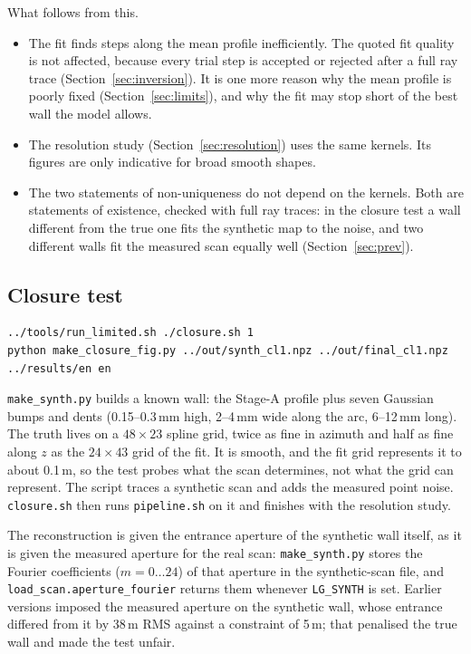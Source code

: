 \documentclass[11pt,a4paper]{article}
\newcommand{\um}{\,\textmu m}
\newcommand{\code}[1]{\texttt{#1}}
\begin{document}
What follows from this.
\begin{itemize}
\item The fit finds steps along the mean profile inefficiently. The quoted fit quality is not
affected, because every trial step is accepted or rejected after a full ray trace
(Section~\ref{sec:inversion}). It is one more reason why the mean profile is poorly fixed
(Section~\ref{sec:limits}), and why the fit may stop short of the best wall the model allows.
\item The resolution study (Section~\ref{sec:resolution}) uses the same kernels. Its figures are
only indicative for broad smooth shapes.
\item The two statements of non-uniqueness do not depend on the kernels. Both are statements of
existence, checked with full ray traces: in the closure test a wall different from the true one fits
the synthetic map to the noise, and two different walls fit the measured scan equally well
(Section~\ref{sec:prev}).
\end{itemize}

\subsection{Closure test}

\begin{lstlisting}
../tools/run_limited.sh ./closure.sh 1
python make_closure_fig.py ../out/synth_cl1.npz ../out/final_cl1.npz ../results/en en
\end{lstlisting}
\code{make\_synth.py} builds a known wall: the Stage-A profile plus seven Gaussian bumps and dents
(0.15--0.3\,mm high, 2--4\,mm wide along the arc, 6--12\,mm long). The truth lives on a
$48\times23$ spline grid, twice as fine in azimuth and half as fine along $z$ as the $24\times43$
grid of the fit. It is smooth, and the fit grid represents it to about 0.1\um, so the test probes
what the scan determines, not what the grid can represent. The script traces a synthetic scan and
adds the measured point noise. \code{closure.sh} then runs \code{pipeline.sh} on it and finishes with
the resolution study.

The reconstruction is given the entrance aperture of the synthetic wall itself, as it is given the
measured aperture for the real scan: \code{make\_synth.py} stores the Fourier coefficients
($m=0\ldots24$) of that aperture in the synthetic-scan file, and \code{load\_scan.aperture\_fourier}
returns them whenever \code{LG\_SYNTH} is set. Earlier versions imposed the measured aperture on the
synthetic wall, whose entrance differed from it by 38\um{} RMS against a constraint of 5\um; that
penalised the true wall and made the test unfair.
\end{document}
